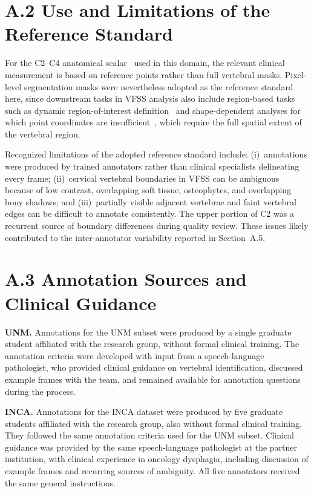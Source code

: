 \documentclass[
  msc,
  american
]{ThesisPUC_v2}
\begin{document}
\section*{A.2 Use and Limitations of the Reference Standard}

For the C2--C4 anatomical scalar~\citep{ref_molfenter} used in this domain, the relevant clinical measurement is based on reference points rather than full vertebral masks. Pixel-level segmentation masks were nevertheless adopted as the reference standard here, since downstream tasks in VFSS analysis also include region-based tasks such as dynamic region-of-interest definition~\citep{ref_lee2020} and shape-dependent analyses for which point coordinates are insufficient~\citep{ref_fujinaka}, which require the full spatial extent of the vertebral region.

Recognized limitations of the adopted reference standard include: (i)~annotations were produced by trained annotators rather than clinical specialists delineating every frame; (ii)~cervical vertebral boundaries in VFSS can be ambiguous because of low contrast, overlapping soft tissue, osteophytes, and overlapping bony shadows; and (iii)~partially visible adjacent vertebrae and faint vertebral edges can be difficult to annotate consistently. The upper portion of C2 was a recurrent source of boundary differences during quality review. These issues likely contributed to the inter-annotator variability reported in Section~A.5.

\section*{A.3 Annotation Sources and Clinical Guidance}

\textbf{UNM.} Annotations for the UNM subset were produced by a single graduate student affiliated with the research group, without formal clinical training. The annotation criteria were developed with input from a speech-language pathologist, who provided clinical guidance on vertebral identification, discussed example frames with the team, and remained available for annotation questions during the process.

\textbf{INCA.} Annotations for the INCA dataset were produced by five graduate students affiliated with the research group, also without formal clinical training. They followed the same annotation criteria used for the UNM subset. Clinical guidance was provided by the same speech-language pathologist at the partner institution, with clinical experience in oncology dysphagia, including discussion of example frames and recurring sources of ambiguity. All five annotators received the same general instructions.
\end{document}
